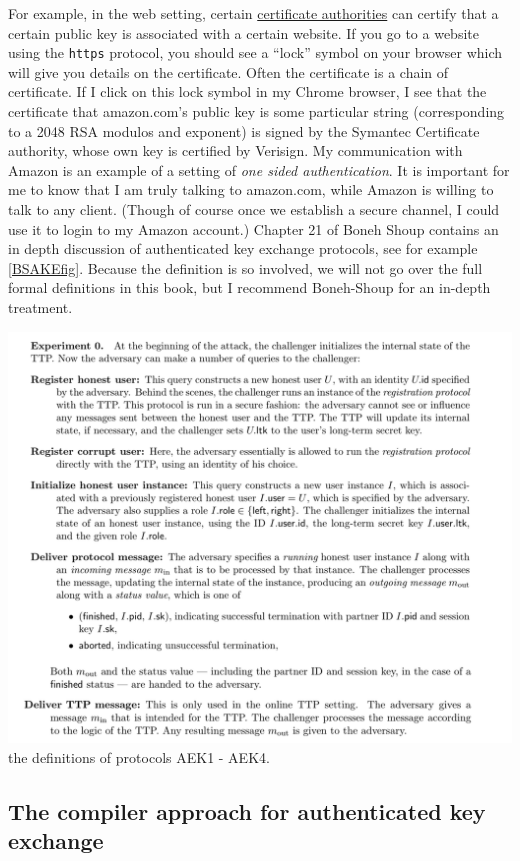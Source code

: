 For example, in the web setting, certain
\href{https://en.wikipedia.org/wiki/Certificate_authority}{certificate
authorities} can certify that a certain public key is associated with a
certain website. If you go to a website using the \texttt{https}
protocol, you should see a ``lock'' symbol on your browser which will
give you details on the certificate. Often the certificate is a chain of
certificate. If I click on this lock symbol in my Chrome browser, I see
that the certificate that amazon.com's public key is some particular
string (corresponding to a 2048 RSA modulos and exponent) is signed by
the Symantec Certificate authority, whose own key is certified by
Verisign. My communication with Amazon is an example of a setting of
\emph{one sided authentication}. It is important for me to know that I
am truly talking to amazon.com, while Amazon is willing to talk to any
client. (Though of course once we establish a secure channel, I could
use it to login to my Amazon account.) Chapter 21 of Boneh Shoup
contains an in depth discussion of authenticated key exchange protocols,
see for example \cref{BSAKEfig}. Because the definition is so involved,
we will not go over the full formal definitions in this book, but I
recommend Boneh-Shoup for an in-depth treatment.

\includegraphics{../figure/AKEdef.png} the definitions of protocols AEK1
- AEK4.

\subsection{The compiler approach for authenticated key
exchange}\label{12-The-compiler-approach-}

